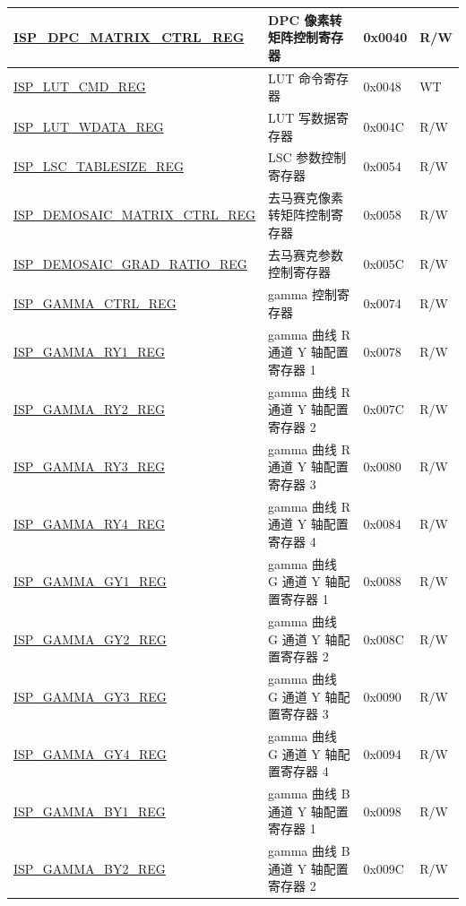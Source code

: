 \begin{longtable}{ | p{6cm} | p{7.2cm} | p{1.3cm} | p{1cm} | }
\hyperref[regdesc:ISPDPCMATRIXCTRLREG]{ISP\_DPC\_MATRIX\_CTRL\_REG} & DPC 像素转矩阵控制寄存器 & 0x0040 & R/W \\ \hline
\hyperref[regdesc:ISPLUTCMDREG]{ISP\_LUT\_CMD\_REG} & LUT 命令寄存器 & 0x0048 & WT \\ \hline
\hyperref[regdesc:ISPLUTWDATAREG]{ISP\_LUT\_WDATA\_REG} & LUT 写数据寄存器 & 0x004C & R/W \\ \hline
\hyperref[regdesc:ISPLSCTABLESIZEREG]{ISP\_LSC\_TABLESIZE\_REG} & LSC 参数控制寄存器 & 0x0054 & R/W \\ \hline
\hyperref[regdesc:ISPDEMOSAICMATRIXCTRLREG]{ISP\_DEMOSAIC\_MATRIX\_CTRL\_REG} & 去马赛克像素转矩阵控制寄存器 & 0x0058 & R/W \\ \hline
\hyperref[regdesc:ISPDEMOSAICGRADRATIOREG]{ISP\_DEMOSAIC\_GRAD\_RATIO\_REG} & 去马赛克参数控制寄存器 & 0x005C & R/W \\ \hline
\hyperref[regdesc:ISPGAMMACTRLREG]{ISP\_GAMMA\_CTRL\_REG} & gamma 控制寄存器 & 0x0074 & R/W \\ \hline
\hyperref[regdesc:ISPGAMMARY1REG]{ISP\_GAMMA\_RY1\_REG} & gamma 曲线 R 通道 Y 轴配置寄存器 1 & 0x0078 & R/W \\ \hline
\hyperref[regdesc:ISPGAMMARY2REG]{ISP\_GAMMA\_RY2\_REG} & gamma 曲线 R 通道 Y 轴配置寄存器 2 & 0x007C & R/W \\ \hline
\hyperref[regdesc:ISPGAMMARY3REG]{ISP\_GAMMA\_RY3\_REG} & gamma 曲线 R 通道 Y 轴配置寄存器 3 & 0x0080 & R/W \\ \hline
\hyperref[regdesc:ISPGAMMARY4REG]{ISP\_GAMMA\_RY4\_REG} & gamma 曲线 R 通道 Y 轴配置寄存器 4 & 0x0084 & R/W \\ \hline
\hyperref[regdesc:ISPGAMMAGY1REG]{ISP\_GAMMA\_GY1\_REG} & gamma 曲线 G 通道 Y 轴配置寄存器 1 & 0x0088 & R/W \\ \hline
\hyperref[regdesc:ISPGAMMAGY2REG]{ISP\_GAMMA\_GY2\_REG} & gamma 曲线 G 通道 Y 轴配置寄存器 2 & 0x008C & R/W \\ \hline
\hyperref[regdesc:ISPGAMMAGY3REG]{ISP\_GAMMA\_GY3\_REG} & gamma 曲线 G 通道 Y 轴配置寄存器 3 & 0x0090 & R/W \\ \hline
\hyperref[regdesc:ISPGAMMAGY4REG]{ISP\_GAMMA\_GY4\_REG} & gamma 曲线 G 通道 Y 轴配置寄存器 4 & 0x0094 & R/W \\ \hline
\hyperref[regdesc:ISPGAMMABY1REG]{ISP\_GAMMA\_BY1\_REG} & gamma 曲线 B 通道 Y 轴配置寄存器 1 & 0x0098 & R/W \\ \hline
\hyperref[regdesc:ISPGAMMABY2REG]{ISP\_GAMMA\_BY2\_REG} & gamma 曲线 B 通道 Y 轴配置寄存器 2 & 0x009C & R/W \\ \hline

\end{longtable}
